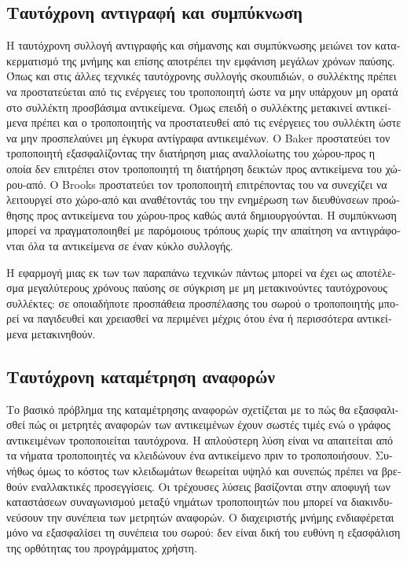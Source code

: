 \begin{greek}
\subsection{Ταυτόχρονη αντιγραφή και συμπύκνωση}
Η ταυτόχρονη συλλογή αντιγραφής και σήμανσης και συμπύκνωσης
μειώνει τον κατακερματισμό της μνήμης και επίσης αποτρέπει
την εμφάνιση μεγάλων χρόνων παύσης. Όπως και στις άλλες
τεχνικές ταυτόχρονης συλλογής σκουπιδιών, ο συλλέκτης πρέπει να προστατεύεται
από τις ενέργειες του τροποποιητή ώστε να μην υπάρχουν
μη ορατά στο συλλέκτη προσβάσιμα αντικείμενα. Όμως επειδή
ο συλλέκτης μετακινεί αντικείμενα πρέπει και ο τροποποιητής
να προστατευθεί από τις ενέργειες του συλλέκτη ώστε να μην
προσπελαύνει μη έγκυρα αντίγραφα αντικειμένων. Ο Baker
\cite{DBLP:journals/cacm/Baker78} προστατεύει τον τροποποιητή
εξασφαλίζοντας την διατήρηση μιας αναλλοίωτης του χώρου-προς
η οποία δεν επιτρέπει στον τροποποιητή τη διατήρηση δεικτών
προς αντικείμενα του χώρου-από. Ο Brooks \cite{DBLP:conf/lfp/Brooks84}
προστατεύει τον τροποποιητή επιτρέποντας του να συνεχίζει
να λειτουργεί στο χώρο-από και αναθέτοντάς του την ενημέρωση
των διευθύνσεων προώθησης προς αντικείμενα του χώρου-προς
καθώς αυτά δημιουργούνται. 
Η συμπύκνωση μπορεί να πραγματοποιηθεί με παρόμοιους τρόπους
χωρίς την απαίτηση να αντιγράφονται όλα τα αντικείμενα σε
έναν κύκλο συλλογής.

Η εφαρμογή μιας εκ των των παραπάνω τεχνικών πάντως μπορεί να
έχει ως αποτέλεσμα μεγαλύτερους χρόνους παύσης σε σύγκριση
με μη μετακινούντες ταυτόχρονους συλλέκτες: σε οποιαδήποτε
προσπάθεια προσπέλασης του σωρού ο τροποποιητής μπορεί να
παγιδευθεί και χρειασθεί να περιμένει μέχρις ότου ένα ή
περισσότερα αντικείμενα μετακινηθούν.

\subsection{Ταυτόχρονη καταμέτρηση αναφορών}
Το βασικό πρόβλημα της καταμέτρησης αναφορών σχετίζεται με το
πώς θα εξασφαλισθεί πώς οι μετρητές αναφορών των αντικειμένων
έχουν σωστές τιμές ενώ ο γράφος αντικειμένων τροποποιείται
ταυτόχρονα. Η απλούστερη λύση είναι να απαιτείται από τα νήματα
τροποποιητές να κλειδώνουν ένα αντικείμενο πριν το τροποποιήσουν.
Συνήθως όμως το κόστος των κλειδωμάτων θεωρείται υψηλό και συνεπώς
πρέπει να βρεθούν εναλλακτικές προσεγγίσεις. Οι τρέχουσες λύσεις
βασίζονται στην αποφυγή των καταστάσεων συναγωνισμού μεταξύ
νημάτων τροποποιητών που μπορεί να διακινδυνεύσουν την συνέπεια
των μετρητών αναφορών. Ο διαχειριστής μνήμης ενδιαφέρεται μόνο
να εξασφαλίσει τη συνέπεια του σωρού: δεν είναι δική του ευθύνη
η εξασφάλιση της ορθότητας του προγράμματος χρήστη.


\end{greek}
